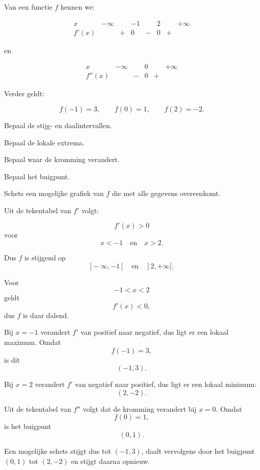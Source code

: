 \documentclass{ximera}
\begin{document}
\begin{oefening}{\oefU\ESS}

Van een functie $f$ kennen we:

\[
\begin{array}{c|ccccccc}
x
& -\infty & & -1 & & 2 & & +\infty \\ \hline

f'(x)
& & + & 0 & - & 0 & + &
\end{array}
\]

en

\[
\begin{array}{c|ccccc}
x
& -\infty & & 0 & & +\infty \\ \hline

f''(x)
& & - & 0 & + &
\end{array}
\]

Verder geldt:

\[
f(-1)=3,\qquad f(0)=1,\qquad f(2)=-2.
\]

\begin{question}
Bepaal de stijg- en daalintervallen.
\end{question}

\begin{question}
Bepaal de lokale extrema.
\end{question}

\begin{question}
Bepaal waar de kromming verandert.
\end{question}

\begin{question}
Bepaal het buigpunt.
\end{question}

\begin{question}
Schets een mogelijke grafiek van $f$ die met alle gegevens
overeenkomt.
\end{question}

\begin{oplossing}

Uit de tekentabel van $f'$ volgt:

\[
f'(x)>0
\]
voor
\[
x<-1
\quad\text{en}\quad
x>2.
\]

Dus $f$ is stijgend op
\[
]-\infty,-1[
\quad\text{en}\quad
]2,+\infty[.
\]

Voor
\[
-1<x<2
\]
geldt
\[
f'(x)<0,
\]
dus $f$ is daar dalend.

Bij $x=-1$ verandert $f'$ van positief naar negatief, dus ligt er een lokaal
maximum. Omdat
\[
f(-1)=3,
\]
is dit
\[
\boxed{(-1,3)}.
\]

Bij $x=2$ verandert $f'$ van negatief naar positief, dus ligt er een lokaal
minimum:
\[
\boxed{(2,-2)}.
\]

Uit de tekentabel van $f''$ volgt dat de kromming verandert bij $x=0$.
Omdat
\[
f(0)=1,
\]
is het buigpunt
\[
\boxed{(0,1)}.
\]

Een mogelijke schets stijgt dus tot $(-1,3)$, daalt vervolgens door het
buigpunt $(0,1)$ tot $(2,-2)$ en stijgt daarna opnieuw.

\end{oplossing}

\end{oefening}
\end{document}
